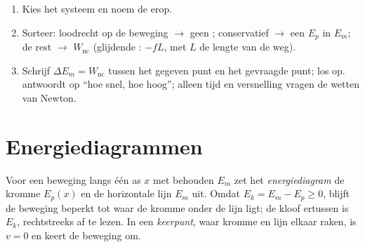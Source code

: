 \begin{method}\label{met:g12:work-and-energy:audit}
\begin{enumerate}
  \item Kies het systeem en noem de  erop.
  \item Sorteer: loodrecht op de beweging $\to$ geen ; conservatief
        $\to$ een $E_p$ in $E_m$; de rest $\to$ $W_{\text{nc}}$ (glijdende
        : $-fL$, met $L$ de lengte van de weg).
  \item Schrijf $\Delta E_m = W_{\text{nc}}$ tussen het gegeven punt en het
        gevraagde punt; los op.  antwoordt op ``hoe snel, hoe hoog'';
        alleen tijd en versnelling vragen de wetten van Newton.
\end{enumerate}
\end{method}

\section{Energiediagrammen}

\begin{definition}\label{def:g12:work-and-energy:diagram}
Voor een beweging langs één as $x$ met behouden $E_m$ zet het
\emph{energiediagram} de kromme $E_p(x)$ en de
horizontale lijn $E_m$ uit. Omdat $E_k = E_m - E_p \geq 0$, blijft de beweging
beperkt tot waar de kromme onder de lijn ligt; de kloof ertussen is $E_k$,
rechtstreeks af te lezen. In een \emph{keerpunt}, waar kromme
en lijn elkaar raken, is $v = 0$ en keert de beweging om.
\end{definition}

